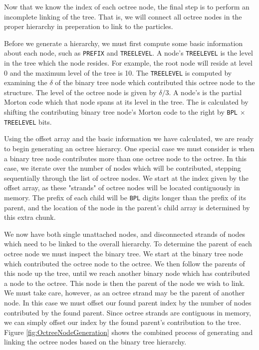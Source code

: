 \documentclass{thesis}
\begin{document}
Now that we know the index of each octree node, the final step is to perform an incomplete linking of the tree. That is, we will connect all octree nodes in the proper hierarchy in preperation to link to the particles.

Before we generate a hierarchy, we must first compute some basic information about each node, such as \texttt{PREFIX} and \texttt{TREELEVEL}. A node's \texttt{TREELEVEL} is the level in the tree which the node resides. For example, the root node will reside at level 0 and the maximum level of the tree is 10. The \texttt{TREELEVEL} is computed by examining the $\delta$ of the binary tree node which contributed this octree node to the structure. The level of the octree node is given by $\delta/3$. A node's  is the partial  Morton code which that node spans at its level in the tree. The  is calculated by shifting the contributing binary tree node's  Morton code to the right by \texttt{BPL} $\times$ \texttt{TREELEVEL} bits.  

Using the offset array and the basic information we have calculated, we are ready to begin generating an octree hierarcy. One special case we must consider is when a binary tree node contributes more than one octree node to the octree. In this case, we iterate over the number of nodes which will be contributed, stepping sequentially through the list of octree nodes. We start at the index given by the offset array, as these "strands" of octree nodes will be located contiguously in memory. The prefix of each child will be \texttt{BPL} digits longer than the prefix of its parent, and the location of the node in the parent's child array is determined by this extra chunk.

We now have both single unattached nodes, and disconnected strands of nodes which need to be linked to the overall hierarchy. To determine the parent of each octree node we must inspect the binary tree. We start at the binary tree node which contributed the octree node to the octree. We then follow the parents of this node up the tree, until we reach another binary node which has contributed a node to the octree. This node is then the parent of the node we wish to link. We must take care, however, as an octree strand may be the parent of another node. In this case we must offset our found parent index by the number of nodes contributed by the found parent. Since octree strands are contiguous in memory, we can simply offset our index by the found parent's contribution to the tree. Figure \ref{fig:OctreeNodeGeneration} shows the combined process of generating and linking the octree nodes based on the binary tree hierarchy.
\end{document}
